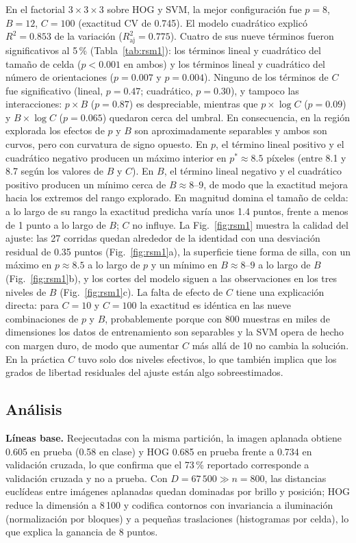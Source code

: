 \documentclass[conference]{IEEEtran}
\begin{document}
En el factorial $3\times3\times3$ sobre HOG y SVM, la mejor configuración fue $p=8$, $B=12$, $C=100$ (exactitud CV de 0.745). El modelo cuadrático explicó $R^2=0.853$ de la variación ($R^2_{\mathrm{aj}}=0.775$). Cuatro de sus nueve términos fueron significativos al 5\,\% (Tabla~\ref{tab:rsm1}): los términos lineal y cuadrático del tamaño de celda ($p<0.001$ en ambos) y los términos lineal y cuadrático del número de orientaciones ($p=0.007$ y $p=0.004$). Ninguno de los términos de $C$ fue significativo (lineal, $p=0.47$; cuadrático, $p=0.30$), y tampoco las interacciones: $p\times B$ ($p=0.87$) es despreciable, mientras que $p\times\log C$ ($p=0.09$) y $B\times\log C$ ($p=0.065$) quedaron cerca del umbral. En consecuencia, en la región explorada los efectos de $p$ y $B$ son aproximadamente separables y ambos son curvos, pero con curvatura de signo opuesto. En $p$, el término lineal positivo y el cuadrático negativo producen un máximo interior en $p^{*}\approx8.5$ píxeles (entre 8.1 y 8.7 según los valores de $B$ y $C$). En $B$, el término lineal negativo y el cuadrático positivo producen un mínimo cerca de $B\approx8$--$9$, de modo que la exactitud mejora hacia los extremos del rango explorado. En magnitud domina el tamaño de celda: a lo largo de su rango la exactitud predicha varía unos 1.4 puntos, frente a menos de 1 punto a lo largo de $B$; $C$ no influye. La Fig.~\ref{fig:rsm1} muestra la calidad del ajuste: las 27 corridas quedan alrededor de la identidad con una desviación residual de 0.35 puntos (Fig.~\ref{fig:rsm1}a), la superficie tiene forma de silla, con un máximo en $p\approx8.5$ a lo largo de $p$ y un mínimo en $B\approx8$--$9$ a lo largo de $B$ (Fig.~\ref{fig:rsm1}b), y los cortes del modelo siguen a las observaciones en los tres niveles de $B$ (Fig.~\ref{fig:rsm1}c). La falta de efecto de $C$ tiene una explicación directa: para $C=10$ y $C=100$ la exactitud es idéntica en las nueve combinaciones de $p$ y $B$, probablemente porque con 800 muestras en miles de dimensiones los datos de entrenamiento son separables y la SVM opera de hecho con margen duro, de modo que aumentar $C$ más allá de 10 no cambia la solución. En la práctica $C$ tuvo solo dos niveles efectivos, lo que también implica que los grados de libertad residuales del ajuste están algo sobreestimados.

\subsection{Análisis}
\textbf{Líneas base.} Reejecutadas con la misma partición, la imagen aplanada obtiene 0.605 en prueba (0.58 en clase) y HOG 0.685 en prueba frente a 0.734 en validación cruzada, lo que confirma que el 73\,\% reportado corresponde a validación cruzada y no a prueba. Con $D=67\,500\gg n=800$, las distancias euclídeas entre imágenes aplanadas quedan dominadas por brillo y posición; HOG reduce la dimensión a 8\,100 y codifica contornos con invariancia a iluminación (normalización por bloques) y a pequeñas traslaciones (histogramas por celda), lo que explica la ganancia de 8 puntos.
\end{document}
